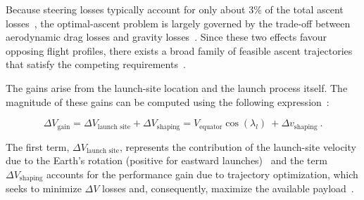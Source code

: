 Because steering losses typically account for only about 3\% of the total ascent losses~\cite{Edberg}, the optimal-ascent problem is largely governed by the trade-off between aerodynamic drag losses and gravity losses~\cite{Ulrich}. Since these two effects favour opposing flight profiles, there exists a broad family of feasible ascent trajectories that satisfy the competing requirements~\cite{Ulrich}.

The gains arise from the launch-site location and the launch process itself. The magnitude of these gains can be computed using the following expression~\cite{Edberg}:

\begin{equation}
\Delta V_{\text{gain}} = \Delta V_{\text{launch\ site}} + \Delta V_{\text{shaping}} = V_{\text{equator}} \cos (\lambda_l) \ + \Delta v_{\text{shaping}} \ .
\end{equation}

The first term, $\Delta V_{\text{launch site}}$, represents the contribution of the launch-site velocity due to the Earth's rotation (positive for eastward launches)~\cite{Edberg} and the term $\Delta V_{\text{shaping}}$ accounts for the performance gain due to trajectory optimization, which seeks to minimize $\Delta V$ losses and, consequently, maximize the available payload~\cite{Edberg}.

